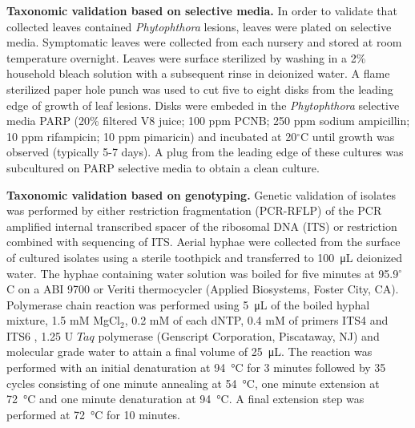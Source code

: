\documentclass[12pt]{article}
\begin{document}
\textbf{Taxonomic validation based on selective media.} In order to validate that collected leaves contained \emph{Phytophthora} lesions, leaves were plated on selective media.  Symptomatic leaves were collected from each nursery and stored at room temperature overnight.  Leaves were surface sterilized by washing in a 2\% household bleach solution with a subsequent rinse in deionized water.  A flame sterilized paper hole punch was used to cut five to eight disks from the leading edge of growth of leaf lesions.  Disks were embeded in the \emph{Phytophthora} selective media PARP (20\% filtered V8 juice; 100 ppm PCNB; 250 ppm sodium ampicillin; 10 ppm rifampicin; 10 ppm pimaricin)\cite{jeffers_martin_1986} and incubated at 20$^\circ$C until growth was observed (typically 5-7 days).  A plug from the leading edge of these cultures was subcultured on PARP selective media to obtain a clean culture.

\textbf{Taxonomic validation based on genotyping.} Genetic validation of isolates was performed by either restriction fragmentation (PCR-RFLP) of the PCR amplified internal transcribed spacer of the ribosomal DNA (ITS) or restriction combined with sequencing of ITS.  Aerial hyphae were collected from the surface of cultured isolates using a sterile toothpick and transferred to \SI{100}{\micro\liter} deionized water.  The hyphae containing water solution was boiled for five minutes at 95.9$^\circ$C on a ABI 9700 or Veriti thermocycler (Applied Biosystems, Foster City, CA).  Polymerase chain reaction was performed using \SI{5}{\micro\liter} of the boiled hyphal mixture, 1.5 mM MgCl$_{2}$, 0.2 mM of each dNTP, 0.4 mM of primers ITS4 and ITS6 \cite{grunwald_etal_2011, cooke_etal_2000},  1.25 U $Taq$ polymerase (Genscript Corporation, Piscataway, NJ) and molecular grade water to attain a final volume of \SI{25}{\micro\liter}.  The reaction was performed with an initial denaturation at \SI{94}{\celsius} for 3 minutes followed by 35 cycles consisting of one minute annealing at \SI{54}{\celsius}, one minute extension at \SI{72}{\celsius} and one minute denaturation at \SI{94}{\celsius}.  A final extension step was performed at \SI{72}{\celsius} for 10 minutes.

\end{document}
